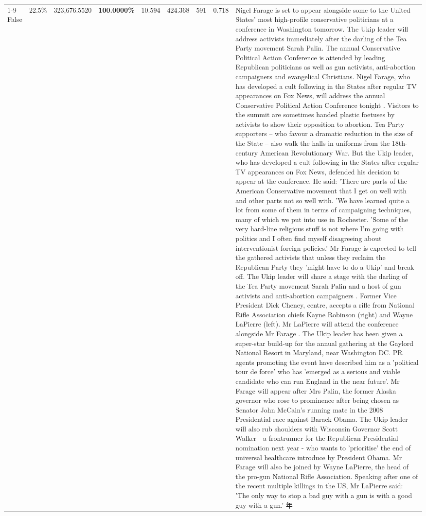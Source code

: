 \begin{table}[H]
\begin{tabular}{lllrlllll}
\cline{1-9}
False & 22.5\% & 323,676.5520 & \bfseries \color{red} 100.0000\% & 10.594 & 424.368 & 591 & 0.718 & Nigel Farage is set to appear alongside some to the United States' most high-profile conservative politicians at a conference in Washington tomorrow. The Ukip leader will address activists immediately after the darling of the Tea Party movement Sarah Palin. The annual Conservative Political Action Conference is attended by leading Republican politicians as well as gun activists, anti-abortion campaigners and evangelical Christians. Nigel Farage, who has developed a cult following in the States after regular TV appearances on Fox News, will address the annual Conservative Political Action Conference tonight . Visitors to the summit are sometimes handed plastic foetuses by activists to show their opposition to abortion. Tea Party supporters – who favour a dramatic reduction in the size of the State – also walk the halls in uniforms from the 18th-century American Revolutionary War. But the Ukip leader, who has developed a cult following in the States after regular TV appearances on Fox News, defended his decision to appear at the conference. He said: 'There are parts of the American Conservative movement that I get on well with and other parts not so well with. 'We have learned quite a lot from some of them in terms of campaigning techniques, many of which we put into use in Rochester. 'Some of the very hard-line religious stuff is not where I'm going with politics and I often find myself disagreeing about interventionist foreign policies.' Mr Farage is expected to tell the gathered activists that unless they reclaim the Republican Party they 'might have to do a Ukip' and break off. The Ukip leader will share a stage with the darling of the Tea Party movement Sarah Palin and a host of gun activists and anti-abortion campaigners . Former Vice President Dick Cheney, centre, accepts a rifle from National Rifle Association chiefs Kayne Robinson (right) and Wayne LaPierre (left). Mr LaPierre will attend the conference alongside Mr Farage . The Ukip leader has been given a super-star build-up for the annual gathering at the Gaylord National Resort in Maryland, near Washington DC. PR agents promoting the event have described him as a 'political tour de force' who has 'emerged as a serious and viable candidate who can run England in the near future'. Mr Farage will appear after Mrs Palin, the former Alaska governor who rose to prominence after being chosen as Senator John McCain's running mate in the 2008 Presidential race against Barack Obama. The Ukip leader will also rub shoulders with Wisconsin Governor Scott Walker - a frontrunner for the Republican Presidential nomination next year - who wants to 'prioritise' the end of universal healthcare introduce by President Obama. Mr Farage will also be joined by Wayne LaPierre, the head of the pro-gun National Rifle Association. Speaking after one of the recent multiple killings in the US, Mr LaPierre said: 'The only way to stop a bad guy with a gun is with a good guy with a gun.' 年 \\

\end{tabular}
\end{table}
